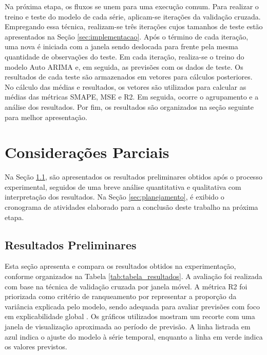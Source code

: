 \documentclass[12pt]{tcc}
\begin{document}
Na próxima etapa, os fluxos se unem para uma execução comum. Para realizar o treino e teste do modelo de cada série, aplicam-se iterações da validação cruzada. Empregando essa técnica, realizam-se três iterações cujos tamanhos de teste estão apresentados na Seção \ref{sec:implementacao}. Após o término de cada iteração, uma nova é iniciada com a janela sendo deslocada para frente pela mesma quantidade de observações do teste. Em cada iteração, realiza-se o treino do modelo Auto \gls{ARIMA} e, em seguida, as previsões com os dados de teste. Os resultados de cada teste são armazenados em vetores para cálculos posteriores. No cálculo das médias e resultados, os vetores são utilizados para calcular as médias das métricas \gls{SMAPE}, \gls{MSE} e \gls{R2}. Em seguida, ocorre o agrupamento e a análise dos resultados. Por fim, os resultados são organizados na seção seguinte para melhor apresentação.

\chapter{Considerações Parciais}
\label{sec:consideracoes_parciais}

Na Seção \ref{sec:aval_exp}, são apresentados os resultados preliminares obtidos após o processo experimental, seguidos de uma breve análise quantitativa e qualitativa com interpretação dos resultados. Na Seção \ref{sec:planejamento}, é exibido o cronograma de atividades elaborado para a conclusão deste trabalho na próxima etapa.

\section{Resultados Preliminares}
\label{sec:aval_exp}

Esta seção apresenta e compara os resultados obtidos na experimentação, conforme organizados na Tabela \ref{tab:tabela_resultados}. A avaliação foi realizada com base na técnica de validação cruzada por janela móvel. A métrica \gls{R2} foi priorizada como critério de ranqueamento por representar a proporção da variância explicada pelo modelo, sendo adequada para avaliar previsões com foco em explicabilidade global \citep{chicco_coefficient_2021}. Os gráficos utilizados mostram um recorte com uma janela de visualização aproximada ao período de previsão. A linha listrada em azul indica o ajuste do modelo à série temporal, enquanto a linha em verde indica os valores previstos.
\end{document}
